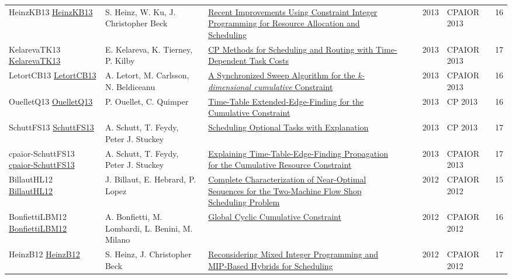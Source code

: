 {\begin{longtable}{p{3cm}p{6cm}p{7cm}rrrp{3cm}r}
HeinzKB13 \href{https://doi.org/10.1007/978-3-642-38171-3\_2}{HeinzKB13} & S. Heinz, W. Ku, J. Christopher Beck & \href{papers/HeinzKB13.pdf}{Recent Improvements Using Constraint Integer Programming for Resource Allocation and Scheduling} &  & \cite{HeinzKB13} & 2013 & CPAIOR 2013 & 16\\
KelarevaTK13 \href{https://doi.org/10.1007/978-3-642-38171-3\_8}{KelarevaTK13} & E. Kelareva, K. Tierney, P. Kilby & \href{papers/KelarevaTK13.pdf}{{CP} Methods for Scheduling and Routing with Time-Dependent Task Costs} &  & \cite{KelarevaTK13} & 2013 & CPAIOR 2013 & 17\\
LetortCB13 \href{https://doi.org/10.1007/978-3-642-38171-3\_10}{LetortCB13} & A. Letort, M. Carlsson, N. Beldiceanu & \href{papers/LetortCB13.pdf}{A Synchronized Sweep Algorithm for the \emph{k-dimensional cumulative} Constraint} &  & \cite{LetortCB13} & 2013 & CPAIOR 2013 & 16\\
OuelletQ13 \href{https://doi.org/10.1007/978-3-642-40627-0\_42}{OuelletQ13} & P. Ouellet, C. Quimper & \href{papers/OuelletQ13.pdf}{Time-Table Extended-Edge-Finding for the Cumulative Constraint} &  & \cite{OuelletQ13} & 2013 & CP 2013 & 16\\
SchuttFS13 \href{https://doi.org/10.1007/978-3-642-40627-0\_47}{SchuttFS13} & A. Schutt, T. Feydy, Peter J. Stuckey & \href{papers/SchuttFS13.pdf}{Scheduling Optional Tasks with Explanation} &  & \cite{SchuttFS13} & 2013 & CP 2013 & 17\\
cpaior-SchuttFS13 \href{https://doi.org/10.1007/978-3-642-38171-3\_16}{cpaior-SchuttFS13} & A. Schutt, T. Feydy, Peter J. Stuckey & \href{papers/cpaior-SchuttFS13.pdf}{Explaining Time-Table-Edge-Finding Propagation for the Cumulative Resource Constraint} &  & \cite{cpaior-SchuttFS13} & 2013 & CPAIOR 2013 & 17\\
BillautHL12 \href{https://doi.org/10.1007/978-3-642-29828-8\_5}{BillautHL12} & J. Billaut, E. Hebrard, P. Lopez & \href{papers/BillautHL12.pdf}{Complete Characterization of Near-Optimal Sequences for the Two-Machine Flow Shop Scheduling Problem} &  & \cite{BillautHL12} & 2012 & CPAIOR 2012 & 15\\
BonfiettiLBM12 \href{https://doi.org/10.1007/978-3-642-29828-8\_6}{BonfiettiLBM12} & A. Bonfietti, M. Lombardi, L. Benini, M. Milano & \href{papers/BonfiettiLBM12.pdf}{Global Cyclic Cumulative Constraint} &  & \cite{BonfiettiLBM12} & 2012 & CPAIOR 2012 & 16\\
HeinzB12 \href{https://doi.org/10.1007/978-3-642-29828-8\_14}{HeinzB12} & S. Heinz, J. Christopher Beck & \href{papers/HeinzB12.pdf}{Reconsidering Mixed Integer Programming and MIP-Based Hybrids for Scheduling} &  & \cite{HeinzB12} & 2012 & CPAIOR 2012 & 17\\

\end{longtable}}
